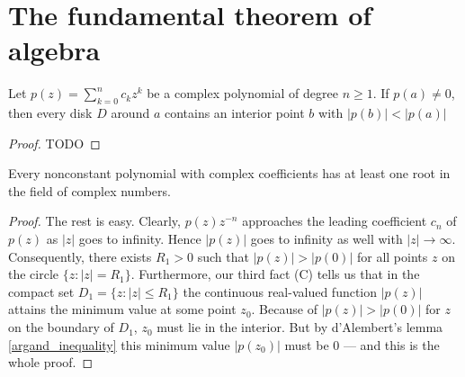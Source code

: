 \chapter{The fundamental theorem of algebra}

\begin{lemma}
  \label{argand_inequality}
  Let $p(z) = \sum_{k=0}^n c_k z^k$ be a complex polynomial of degree $n\ge 1$.
  If $p(a)\ne0$, then every disk $D$ around $a$ contains an interior point $b$ with $|p(b)| < |p(a)|$
\end{lemma}
\begin{proof}
  TODO
\end{proof}

\begin{theorem}
  \label{fundamental_theorem_of_algbra}
  Every nonconstant polynomial with complex coefficients has at least one root in the field of complex numbers.
\end{theorem}
\begin{proof}
  The rest is easy. Clearly, $p(z)z^{-n}$ approaches the leading coefficient $c_n$
  of $p(z)$ as $|z|$ goes to infinity. Hence $|p(z)|$ goes to infinity as well with
  $|z| \to \infty$. Consequently, there exists $R_1 > 0$ such that $|p(z)| > |p(0)|$ for
  all points $z$ on the circle $\{ z : |z| = R_1 \}$. Furthermore, our third fact (C)
  tells us that in the compact set $D_1 = \{ z : |z| \leq R_1 \}$ the continuous real-valued
  function $|p(z)|$ attains the minimum value at some point $z_0$. Because
  of $|p(z)| > |p(0)|$ for $z$ on the boundary of $D_1$, $z_0$ must lie in the interior.
  But by d'Alembert's lemma \ref{argand_inequality} this minimum value $|p(z_0)|$ must
  be $0$ — and this is the whole proof.
\end{proof}
